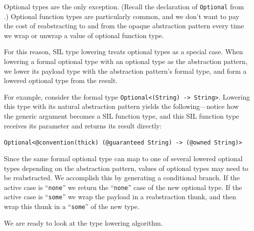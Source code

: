 \documentclass[../generics]{subfiles}
\begin{document}
Optional types are the only exception. (Recall the declaration of \texttt{Optional} from .) Optional function types are particularly common, and we don't want to pay the cost of reabstracting to and from the opaque abstraction pattern every time we wrap or unwrap a value of optional function type.

For this reason, SIL type lowering treats optional types as a special case. When lowering a formal optional type with an optional type as the abstraction pattern, we lower its payload type with the abstraction pattern's formal type, and form a lowered optional type from the result.

For example, consider the formal type \texttt{Optional<(String) -> String>}. Lowering this type with its natural abstraction pattern yields the following---notice how the generic argument becomes a SIL function type, and this SIL function type receives its parameter and returns its result directly:
\begin{center}
\texttt{Optional<@convention(thick) (@guaranteed String) -> (@owned String)>}
\end{center}

Since the same formal optional type can map to one of several lowered optional types depending on the abstraction pattern, values of optional types may need to be reabstracted. We accomplish this  by generating a conditional branch. If the active case is ``\texttt{none}'' we return the ``\texttt{none}'' case of the new optional type. If the active case is ``\texttt{some}'' we wrap the payload in a reabstraction thunk, and then wrap this thunk in a ``\texttt{some}'' of the new type.

We are ready to look at the type lowering algorithm.
\end{document}
